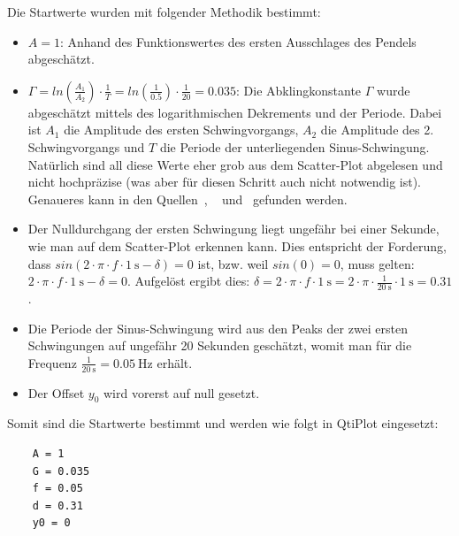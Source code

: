 Die Startwerte wurden mit folgender Methodik bestimmt:
\begin{itemize}
    \item
        $A = 1$: Anhand des Funktionswertes des ersten Ausschlages des Pendels
        abgesch\"atzt.
    \item
        $\Gamma  =  ln  \left(\frac{A_1}{A_2}   \right)  \cdot  \frac{1}{T}  =
        ln  \left(\frac{1}{0.5}   \right)  \cdot   \frac{1}{20}  =   0.035  $:
        Die   Abklingkonstante  $\Gamma$   wurde  abgesch\"atzt   mittels  des
        logarithmischen   Dekrements   und   der  Periode. Dabei   ist   $A_1$
        die  Amplitude   des  ersten  Schwingvorgangs,  $A_2$   die  Amplitude
        des  2. Schwingvorgangs   und  $T$  die  Periode   der  unterliegenden
        Sinus-Schwingung. Nat\"urlich   sind  all   diese   Werte  eher   grob
        aus   dem  Scatter-Plot   abgelesen  und   nicht  hochpr\"azise   (was
        aber  f\"ur  diesen  Schritt   auch  nicht  notwendig  ist). Genaueres
        kann     in     den     Quellen~\cite{ref:wikipedia:abklingkonstante},
        ~\cite{ref:wikipedia:periode}   und~\cite{ref:wikipedia:logarithmDekr}
        gefunden werden.
    \item
        Der  Nulldurchgang der  ersten Schwingung  liegt ungef\"ahr  bei einer
        Sekunde, wie  man auf dem Scatter-Plot  erkennen kann. Dies entspricht
        der Forderung, dass  $sin(2 \cdot \pi \cdot f  \cdot \SI{1}{\second} -
        \delta) = 0$ ist,  bzw. weil $sin(0) = 0$, muss  gelten:  $2 \cdot \pi
        \cdot f \cdot \SI{1}{\second} -  \delta = 0$. Aufgel\"ost ergibt dies:
        $\delta =  2 \cdot  \pi \cdot  f \cdot \SI{1}{\second}  = 2  \cdot \pi
        \cdot \frac{1}{\SI{20}{\second}} \cdot \SI{1}{\second} = 0.31$.
    \item
        Die Periode  der Sinus-Schwingung wird  aus den Peaks der  zwei ersten
        Schwingungen  auf  ungef\"ahr  20   Sekunden  gesch\"atzt,  womit  man
        f\"ur  die Frequenz  $\frac{1}{\SI{20}{\second}} =  \SI{0.05}{\hertz}$
        erh\"alt.
    \item
        Der Offset $y_0$ wird vorerst auf null gesetzt.
\end{itemize}

Somit sind die Startwerte bestimmt und werden wie folgt in QtiPlot eingesetzt:
\begin{verbatim}
    A = 1
    G = 0.035
    f = 0.05
    d = 0.31
    y0 = 0
\end{verbatim}

